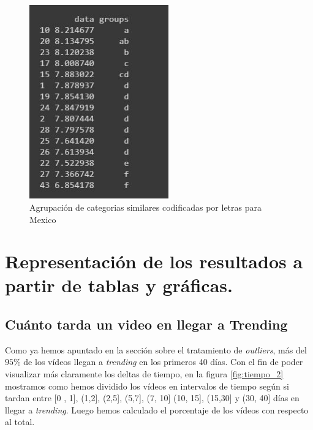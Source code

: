\documentclass[a4paper,12pt]{article}
\begin{document}
\begin{figure}[h!]
\centering
\includegraphics[width=6cm]{Berro.JPG}
\caption{Agrupaci\'on de categorias similares codificadas por letras para Mexico}
\label{fig:Berro}
\end{figure}

\section{Representaci\'on de los resultados a partir de tablas y gr\'aficas.}


\subsection{Cu\'anto tarda un video en llegar a Trending}

Como ya hemos apuntado en la secci\'on sobre el tratamiento de {\itshape outliers}, m\'as del $95\%$ de los v\'ideos llegan a {\itshape trending} en los primeros 40 d\'ias. Con el fin de poder visualizar m\'as claramente  los deltas de tiempo, en la figura \ref{fig:tiempo_2} mostramos como hemos dividido los v\'ideos en intervalos de tiempo seg\'un si tardan entre [0 , 1], (1,2], (2,5], (5,7], (7, 10] (10, 15], (15,30] y (30, 40] d\'ias en llegar a {\itshape trending}. Luego hemos calculado el porcentaje de los v\'ideos con respecto al total.
\end{document}
